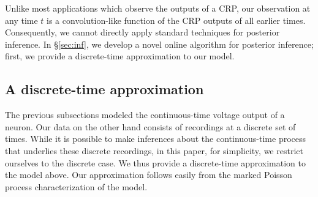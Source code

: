 Unlike most applications which observe the outputs of a CRP, our observation at any time $t$ is a convolution-like function of the CRP outputs of all
earlier times. Consequently, we cannot directly apply standard techniques for posterior inference. In \S \ref{sec:inf}, we develop a novel online 
algorithm for posterior inference; first, we provide a discrete-time approximation to our model.


\vspace{-.1in}
\subsection{A discrete-time approximation}
The previous subsections modeled the continuous-time voltage output of a neuron. Our data on the other hand consists of recordings
at a discrete set of times. While it is possible to make inferences about the continuous-time process that underlies these discrete recordings,
in this paper, for simplicity, we restrict ourselves to the discrete case. We thus provide a discrete-time approximation to the model above. 
Our approximation follows easily from the marked Poisson process characterization of the model.

